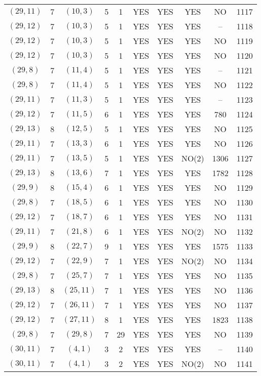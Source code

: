 \begin{longtable}{|c|c|c|c|c|c|c|c|c|c|}
$(29, 11)$ & 7 & $(10, 3)$ & 5 & 1 & YES & YES & YES & NO & 1117\\
$(29, 12)$ & 7 & $(10, 3)$ & 5 & 1 & YES & YES & YES & -- & 1118\\
$(29, 12)$ & 7 & $(10, 3)$ & 5 & 1 & YES & YES & YES & NO & 1119\\
$(29, 12)$ & 7 & $(10, 3)$ & 5 & 1 & YES & YES & YES & NO & 1120\\
$(29, 8)$ & 7 & $(11, 4)$ & 5 & 1 & YES & YES & YES & -- & 1121\\
$(29, 8)$ & 7 & $(11, 4)$ & 5 & 1 & YES & YES & YES & NO & 1122\\
$(29, 11)$ & 7 & $(11, 3)$ & 5 & 1 & YES & YES & YES & -- & 1123\\
$(29, 12)$ & 7 & $(11, 5)$ & 6 & 1 & YES & YES & YES & 780 & 1124\\
$(29, 13)$ & 8 & $(12, 5)$ & 5 & 1 & YES & YES & YES & NO & 1125\\
$(29, 11)$ & 7 & $(13, 3)$ & 6 & 1 & YES & YES & YES & NO & 1126\\
$(29, 11)$ & 7 & $(13, 5)$ & 5 & 1 & YES & YES & NO(2) & 1306 & 1127\\
$(29, 13)$ & 8 & $(13, 6)$ & 7 & 1 & YES & YES & YES & 1782 & 1128\\
$(29, 9)$ & 8 & $(15, 4)$ & 6 & 1 & YES & YES & YES & NO & 1129\\
$(29, 8)$ & 7 & $(18, 5)$ & 6 & 1 & YES & YES & YES & NO & 1130\\
$(29, 12)$ & 7 & $(18, 7)$ & 6 & 1 & YES & YES & YES & NO & 1131\\
$(29, 11)$ & 7 & $(21, 8)$ & 6 & 1 & YES & YES & NO(2) & NO & 1132\\
$(29, 9)$ & 8 & $(22, 7)$ & 9 & 1 & YES & YES & YES & 1575 & 1133\\
$(29, 12)$ & 7 & $(22, 9)$ & 7 & 1 & YES & YES & NO(2) & NO & 1134\\
$(29, 8)$ & 7 & $(25, 7)$ & 7 & 1 & YES & YES & YES & NO & 1135\\
$(29, 13)$ & 8 & $(25, 11)$ & 7 & 1 & YES & YES & YES & NO & 1136\\
$(29, 12)$ & 7 & $(26, 11)$ & 7 & 1 & YES & YES & YES & NO & 1137\\
$(29, 12)$ & 7 & $(27, 11)$ & 8 & 1 & YES & YES & YES & 1823 & 1138\\
$(29, 8)$ & 7 & $(29, 8)$ & 7 & 29 & YES & YES & YES & NO & 1139\\
$(30, 11)$ & 7 & $(4, 1)$ & 3 & 2 & YES & YES & YES & -- & 1140\\
$(30, 11)$ & 7 & $(4, 1)$ & 3 & 2 & YES & YES & NO(2) & NO & 1141\\

\end{longtable}
